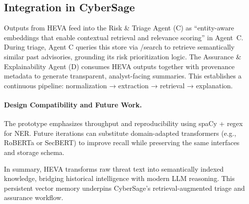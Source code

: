 \subsection{Integration in CyberSage}
Outputs from HEVA feed into the Risk \& Triage Agent (C) as ``entity-aware embeddings that enable contextual retrieval and relevance scoring'' in Agent~C. During triage, Agent C queries this store via /search to retrieve semantically similar past advisories, grounding its risk prioritization logic.
The Assurance \& Explainability Agent (D) consumes HEVA outputs together with provenance metadata to generate transparent, analyst-facing summaries.
This establishes a continuous pipeline: normalization → extraction → retrieval → explanation.

\paragraph{Design Compatibility and Future Work.}
The prototype emphasizes throughput and reproducibility using spaCy + regex for NER.  
Future iterations can substitute domain-adapted transformers (e.g., RoBERTa or SecBERT) to improve recall while preserving the same interfaces and storage schema.

\noindent
In summary, HEVA transforms raw threat text into semantically indexed knowledge, bridging historical intelligence with modern LLM reasoning.  
This persistent vector memory underpins CyberSage’s retrieval-augmented triage and assurance workflow.

\nocite{devlin2018bert, liu2019roberta, mitre2025attack, mitre2025cve}
